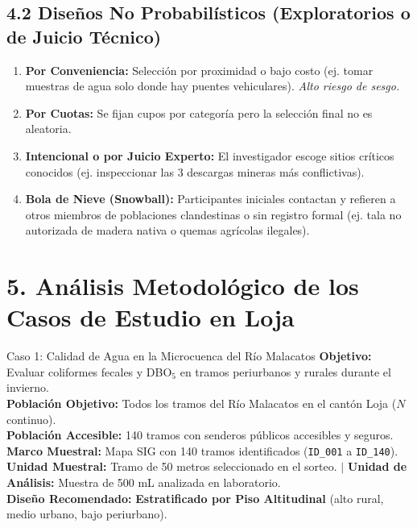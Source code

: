 \documentclass[11pt,a4paper]{article}
\begin{document}
\subsection*{4.2 Diseños No Probabilísticos (Exploratorios o de Juicio Técnico)}
\begin{enumerate}[leftmargin=*]
  \item \textbf{Por Conveniencia:} Selección por proximidad o bajo costo (ej. tomar muestras de agua solo donde hay puentes vehiculares). \textit{Alto riesgo de sesgo.}
  \item \textbf{Por Cuotas:} Se fijan cupos por categoría pero la selección final no es aleatoria.
  \item \textbf{Intencional o por Juicio Experto:} El investigador escoge sitios críticos conocidos (ej. inspeccionar las 3 descargas mineras más conflictivas).
  \item \textbf{Bola de Nieve (Snowball):} Participantes iniciales contactan y refieren a otros miembros de poblaciones clandestinas o sin registro formal (ej. tala no autorizada de madera nativa o quemas agrícolas ilegales).
\end{enumerate}

\vspace{0.2cm}

\section*{5. Análisis Metodológico de los Casos de Estudio en Loja}

\begin{casobox}{Caso 1: Calidad de Agua en la Microcuenca del Río Malacatos}
\textbf{Objetivo:} Evaluar coliformes fecales y DBO$_5$ en tramos periurbanos y rurales durante el invierno.\\
\textbf{Población Objetivo:} Todos los tramos del Río Malacatos en el cantón Loja ($N$ continuo).\\
\textbf{Población Accesible:} 140 tramos con senderos públicos accesibles y seguros.\\
\textbf{Marco Muestral:} Mapa SIG con 140 tramos identificados (\texttt{ID\_001} a \texttt{ID\_140}).\\
\textbf{Unidad Muestral:} Tramo de 50 metros seleccionado en el sorteo. $\vert$ \textbf{Unidad de Análisis:} Muestra de 500 mL analizada en laboratorio.\\
\textbf{Diseño Recomendado:} \textbf{Estratificado por Piso Altitudinal} (alto rural, medio urbano, bajo periurbano).
\end{casobox}
\end{document}
